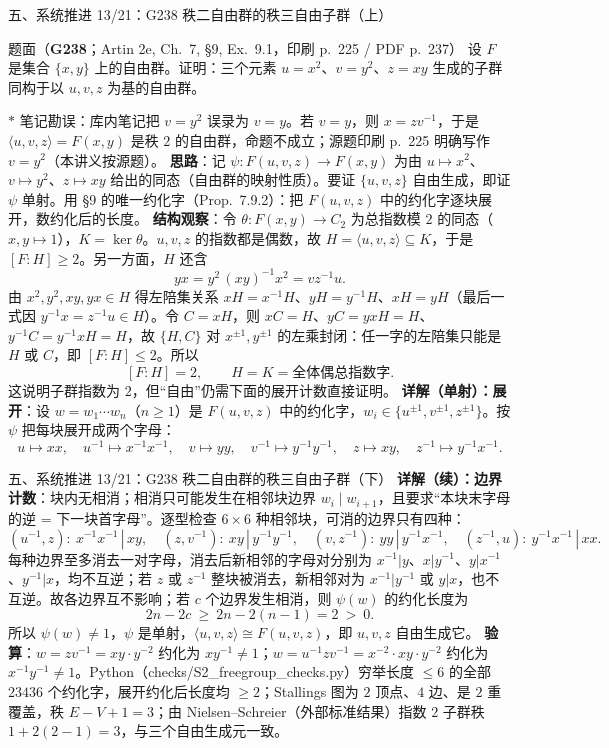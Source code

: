 \documentclass[aspectratio=169,10pt,fontset=none]{ctexbeamer}
\newcommand{\ex}[1]{\textcolor{accent}{\footnotesize\bfseries #1}}
\newcommand{\key}[1]{\textcolor{ink}{\bfseries #1}}
\newcommand{\starpt}{\textcolor{accent}{\bfseries$\ast$}}
\begin{document}
\begin{frame}[t]{五、系统推进 13/21：G238 秩二自由群的秩三自由子群（上）}
\label{ex:G238}
\scriptsize
\begin{block}{\footnotesize 题面（\ex{G238}；Artin 2e, Ch.~7, §9, Ex.~9.1，印刷 p.~225 / PDF p.~237）}
设 $F$ 是集合 $\{x,y\}$ 上的自由群。证明：三个元素 $u=x^2$、$v=y^2$、$z=xy$ 生成的子群同构于以 $u,v,z$ 为基的自由群。
\end{block}
\starpt{} 笔记勘误：库内笔记把 $v=y^2$ 误录为 $v=y$。若 $v=y$，则 $x=zv^{-1}$，于是 $\langle u,v,z\rangle=F(x,y)$ 是秩 $2$ 的自由群，命题不成立；源题印刷 p.~225 明确写作 $v=y^2$（本讲义按源题）。
\key{思路}：记 $\psi:F(u,v,z)\to F(x,y)$ 为由 $u\mapsto x^2$、$v\mapsto y^2$、$z\mapsto xy$ 给出的同态（自由群的映射性质）。要证 $\{u,v,z\}$ 自由生成，即证 $\psi$ 单射。用 §9 的唯一约化字（Prop.~7.9.2）：把 $F(u,v,z)$ 中的约化字逐块展开，数约化后的长度。
\key{结构观察}：令 $\theta:F(x,y)\to C_2$ 为总指数模 $2$ 的同态（$x,y\mapsto1$），$K=\ker\theta$。$u,v,z$ 的指数都是偶数，故 $H=\langle u,v,z\rangle\subseteq K$，于是 $[F:H]\ge2$。另一方面，$H$ 还含
\[ yx=y^2\,(xy)^{-1}x^2=vz^{-1}u . \]
由 $x^2,y^2,xy,yx\in H$ 得左陪集关系 $xH=x^{-1}H$、$yH=y^{-1}H$、$xH=yH$（最后一式因 $y^{-1}x=z^{-1}u\in H$）。令 $C=xH$，则 $xC=H$、$yC=yxH=H$、$y^{-1}C=y^{-1}xH=H$，故 $\{H,C\}$ 对 $x^{\pm1},y^{\pm1}$ 的左乘封闭：任一字的左陪集只能是 $H$ 或 $C$，即 $[F:H]\le2$。所以
\[ [F:H]=2,\qquad H=K=\text{全体偶总指数字}. \]
这说明子群指数为 $2$，但“自由”仍需下面的展开计数直接证明。
\key{详解（单射）：展开}：设 $w=w_1\cdots w_n$（$n\ge1$）是 $F(u,v,z)$ 中的约化字，$w_i\in\{u^{\pm1},v^{\pm1},z^{\pm1}\}$。按 $\psi$ 把每块展开成两个字母：
\[ u\mapsto xx,\quad u^{-1}\mapsto x^{-1}x^{-1},\quad v\mapsto yy,\quad v^{-1}\mapsto y^{-1}y^{-1},\quad z\mapsto xy,\quad z^{-1}\mapsto y^{-1}x^{-1}. \]
\end{frame}

\begin{frame}[t]{五、系统推进 13/21：G238 秩二自由群的秩三自由子群（下）}
\scriptsize
\key{详解（续）：边界计数}：块内无相消；相消只可能发生在相邻块边界 $w_i\mid w_{i+1}$，且要求“本块末字母的逆 = 下一块首字母”。逐型检查 $6\times6$ 种相邻块，可消的边界只有四种：
\[ (u^{-1},z):\ x^{-1}x^{-1}\,|\,xy,\quad (z,v^{-1}):\ xy\,|\,y^{-1}y^{-1},\quad (v,z^{-1}):\ yy\,|\,y^{-1}x^{-1},\quad (z^{-1},u):\ y^{-1}x^{-1}\,|\,xx. \]
每种边界至多消去一对字母，消去后新相邻的字母对分别为 $x^{-1}|y$、$x|y^{-1}$、$y|x^{-1}$、$y^{-1}|x$，均不互逆；若 $z$ 或 $z^{-1}$ 整块被消去，新相邻对为 $x^{-1}|y^{-1}$ 或 $y|x$，也不互逆。故各边界互不影响；若 $c$ 个边界发生相消，则 $\psi(w)$ 的约化长度为
\[ 2n-2c\ \ge\ 2n-2(n-1)=2\ >\ 0 . \]
所以 $\psi(w)\ne1$，$\psi$ 是单射，$\langle u,v,z\rangle\cong F(u,v,z)$，即 $u,v,z$ 自由生成它。
\key{验算}：$w=zv^{-1}=xy\cdot y^{-2}$ 约化为 $xy^{-1}\ne1$；$w=u^{-1}zv^{-1}=x^{-2}\cdot xy\cdot y^{-2}$ 约化为 $x^{-1}y^{-1}\ne1$。Python（\textsf{checks/S2\_freegroup\_checks.py}）穷举长度 $\le6$ 的全部 $23436$ 个约化字，展开约化后长度均 $\ge2$；Stallings 图为 $2$ 顶点、$4$ 边、是 $2$ 重覆盖，秩 $E-V+1=3$；由 Nielsen--Schreier（外部标准结果）指数 $2$ 子群秩 $1+2(2-1)=3$，与三个自由生成元一致。
\end{frame}
\end{document}
